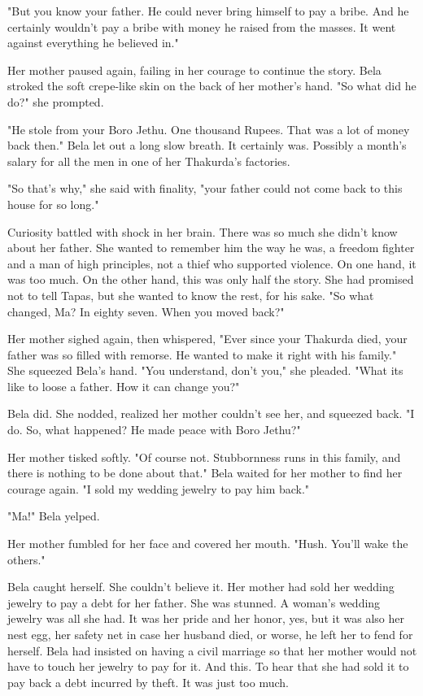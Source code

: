 \documentclass{amsart}
\begin{document}
"But you know your father. He could never bring himself to pay a bribe. And he certainly wouldn't pay a bribe with money he raised from the masses. It went against everything he believed in."

Her mother paused again, failing in her courage to continue the story. Bela stroked the soft crepe-like skin on the back of her mother's hand. "So what did he do?" she prompted.

"He stole from your Boro Jethu. One thousand Rupees. That was a lot of money back then." Bela let out a long slow breath. It certainly was. Possibly a month's salary for all the men in one of her Thakurda's factories. 

"So that's why," she said with finality, "your father could not come back to this house for so long."

Curiosity battled with shock in her brain. There was so much she didn't know about her father. She wanted to remember him the way he was, a freedom fighter and a man of high principles, not a thief who supported violence. On one hand, it was too much. On the other hand, this was only half the story. She had promised not to tell Tapas, but she wanted to know the rest, for his sake. "So what changed, Ma? In eighty seven. When you moved back?"

Her mother sighed again, then whispered, "Ever since your Thakurda died, your father was so filled with remorse. He wanted to make it right with his family." She squeezed Bela's hand. "You understand, don't you," she pleaded. "What its like to loose a father. How it can change you?"

Bela did. She nodded, realized her mother couldn't see her, and squeezed back. "I do. So, what happened? He made peace with Boro Jethu?"

Her mother tisked softly. "Of course not. Stubbornness runs in this family, and there is nothing to be done about that." Bela waited for her mother to find her courage again. "I sold my wedding jewelry to pay him back." 

"Ma!" Bela yelped. 

Her mother fumbled for her face and covered her mouth. "Hush. You'll wake the others." 

Bela caught herself. She couldn't believe it. Her mother had sold her wedding jewelry to pay a debt for her father. She was stunned. A woman's wedding jewelry was all she had. It was her pride and her honor, yes, but it was also her nest egg, her safety net in case her husband died, or worse, he left her to fend for herself. Bela had insisted on having a civil marriage so that her mother would not have to touch her jewelry to pay for it. And this. To hear that she had sold it to pay back a debt incurred by theft. It was just too much.
\end{document}
